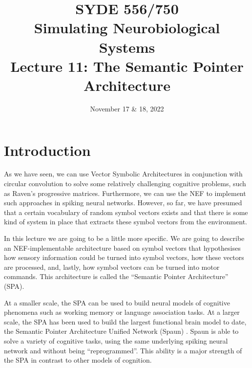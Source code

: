 \documentclass[10pt,letterpaper,oneside]{article}
\date{November 17 \& 18, 2022}
\title{SYDE 556/750 \\ Simulating Neurobiological Systems \\ Lecture 11: The Semantic Pointer Architecture}
\begin{document}

\section{Introduction}


As we have seen, we can use Vector Symbolic Architectures in conjunction with circular convolution to solve some relatively challenging cognitive problems, such as Raven's progressive matrices. Furthermore, we can use the NEF to implement such approaches in spiking neural networks. However, so far, we have presumed that a certain vocabulary of random symbol vectors exists and that there is some kind of system in place that extracts these symbol vectors from the environment.

In this lecture we are going to be a little more specific. We are going to describe an NEF-implementable architecture based on symbol vectors that hypothesises how sensory information could be turned into symbol vectors, how these vectors are processed, and, lastly, how symbol vectors can be turned into motor commands. This architecture is called the \enquote{Semantic Pointer Architecture} (SPA).

At a smaller scale, the SPA can be used to build neural models of cognitive phenomena such as working memory or language association tasks. At a larger scale, the SPA has been used to build the largest functional brain model to date, the Semantic Pointer Architecture Unified Network (Spaun) \cite{eliasmith2012largescale,choo2018spaun}. Spaun is able to solve a variety of cognitive tasks, using the same underlying spiking neural network and without being \enquote{reprogrammed}. This ability is a major strength of the SPA in contrast to other models of cognition.
\end{document}
